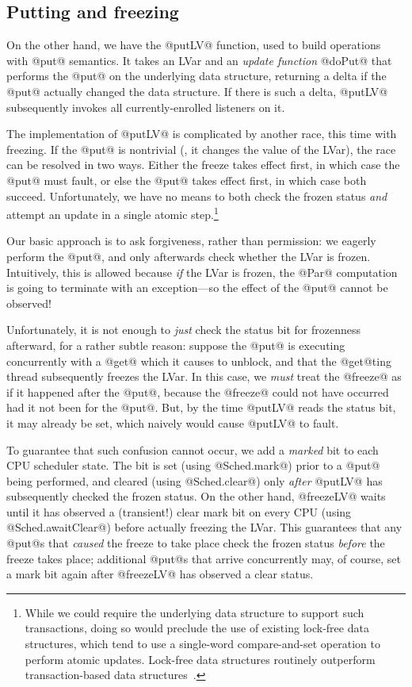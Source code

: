 \subsection{Putting and freezing}

On the other hand, we have the @putLV@ function, used to build operations with
@put@ semantics.  It takes an LVar and an \emph{update function} @doPut@ that
performs the @put@ on the underlying data structure, returning a delta if the
@put@ actually changed the data structure.  If there is such a delta, @putLV@
subsequently invokes all currently-enrolled listeners on it.

The implementation of @putLV@ is complicated by another race, this time with
freezing.  If the @put@ is nontrivial (\ie, it changes the value of the LVar), the
race can be resolved in two ways.  Either the freeze takes effect first, in
which case the @put@ must fault, or else the @put@ takes effect first, in which case
both succeed.  Unfortunately, we have no means to both check the frozen status
\emph{and} attempt an update in a single atomic step.\footnote{While we could
  require the underlying data structure to support such transactions, doing so
  would preclude the use of existing lock-free data structures, which tend to
  use a single-word compare-and-set operation to perform atomic updates.
  Lock-free data structures routinely outperform transaction-based data
  structures~\cite{practical-lock-freedom}.}

Our basic approach is to ask forgiveness, rather than permission: we eagerly
perform the @put@, and only afterwards check whether the LVar is frozen.
Intuitively, this is allowed because \emph{if} the LVar is frozen, the @Par@
computation is going to terminate with an exception---so the effect of the @put@
cannot be observed!  

Unfortunately, it is not enough to \emph{just} check the status bit for frozenness afterward,
for a rather subtle reason: suppose the @put@ is executing concurrently with a
@get@ which it causes to unblock, and that the @get@ting thread subsequently
freezes the LVar.  In this case, we \emph{must} treat the @freeze@ as if it
happened after the @put@, because the @freeze@ could not have occurred had it
not been for the @put@. But, by the time @putLV@ reads the status bit, it may
already be set, which naively would cause @putLV@ to fault.

To guarantee that such confusion cannot occur, we add a \emph{marked} bit to
each CPU scheduler state.  The bit is set (using @Sched.mark@) prior to a @put@
being performed, and cleared (using @Sched.clear@) only \emph{after} @putLV@ has
subsequently checked the frozen status.  On the other hand, @freezeLV@ waits
until it has observed a (transient!) clear mark bit on every CPU (using
@Sched.awaitClear@) before actually freezing the LVar.  This guarantees that any
@put@s that \emph{caused} the freeze to take place check the frozen status
\emph{before} the freeze takes place; additional @put@s that arrive concurrently
may, of course, set a mark bit again after @freezeLV@ has observed a clear status.

